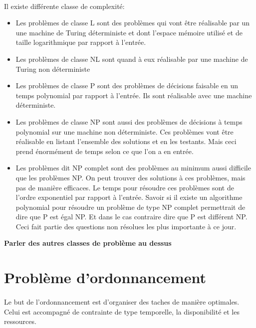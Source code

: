 \documentclass[12pt]{article}
\begin{document}
	\paragraph{}
		Il existe différente classe de complexité:
		
		\begin{itemize}

			\item Les problèmes de classe L sont des problèmes qui vont être réalisable par un une machine de Turing déterministe et dont l'espace mémoire utilisé et de taille logarithmique par rapport à l'entrée.
			
			\item Les problèmes de classe NL sont quand à eux réalisable par une machine de Turing non déterministe
			
			\item Les problèmes de classe P sont des problèmes de décisions faisable en un temps polynomial par rapport à l'entrée. Ils sont réalisable avec une machine déterministe.
			
			\item Les problèmes de classe NP sont aussi des problèmes de décisions à temps polynomial sur une machine non déterministe. Ces problèmes vont être réalisable en listant l'ensemble des solutions et en les testants. Mais ceci prend énormément de temps selon ce que l'on a en entrée.		
			
			\item Les problèmes dit NP complet sont des problèmes au minimum aussi difficile que les problèmes NP. On peut trouver des solutions à ces problèmes, mais pas de manière efficaces. Le temps pour résoudre ces problèmes sont de l'ordre exponentiel par rapport à l'entrée. Savoir si il existe un algorithme polynomial pour résoudre un problème de type NP complet permettrait de dire que P est égal NP. Et dans le cas contraire dire que P est différent NP. Ceci fait partie des questions non résolues les plus importante à ce jour.
			
		\end{itemize}

		\textbf{Parler des autres classes de problème au dessus}

	\section{Problème d'ordonnancement}
		\paragraph{}
			Le but de l'ordonnancement est d'organiser des taches de manière optimales. Celui est accompagné de contrainte de type temporelle, la disponibilité et les ressources.
		
\end{document}
